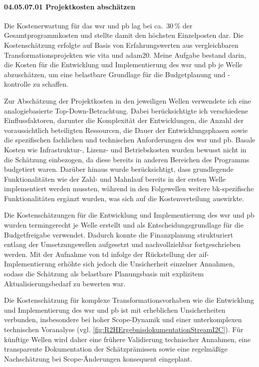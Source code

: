 \paragraph*{04.05.07.01 Projektkosten abschätzen}
\label{para:04.05.07.01_Projektkosten}

\par Die Kostenerwartung für das \gls{wsr} und \gls{pb} lag bei ca.~30\,\% der Gesamtprogrammkosten und stellte damit den höchsten Einzelposten dar. Die Kostenschätzung erfolgte auf Basis von Erfahrungswerten aus vergleichbaren Transformationsprojekten wie \gls{vita} und \gls{adam20}. Meine Aufgabe bestand darin, die Kosten für die Entwicklung und Implementierung des \gls{wsr} und \gls{pb} je Welle abzuschätzen, um eine belastbare Grundlage für die Budgetplanung und -kontrolle zu schaffen.

\par Zur Abschätzung der Projektkosten in den jeweiligen Wellen verwendete ich eine analogiebasierte Top-Down-Betrachtung. Dabei berücksichtigte ich verschiedene Einflussfaktoren, darunter die Komplexität der Entwicklungen, die Anzahl der voraussichtlich beteiligten Ressourcen, die Dauer der Entwicklungsphasen sowie die spezifischen fachlichen und technischen Anforderungen des \gls{wsr} und \gls{pb}. Basale Kosten wie Infrastruktur-, Lizenz- und Betriebskosten wurden bewusst nicht in die Schätzung einbezogen, da diese bereits in anderen Bereichen des Programms budgetiert waren. Darüber hinaus wurde berücksichtigt, dass grundlegende Funktionalitäten wie der Zahl- und Mahnlauf bereits in der ersten Welle implementiert werden mussten, während in den Folgewellen weitere \gls{bk}-spezifische Funktionalitäten ergänzt wurden, was sich auf die Kostenverteilung auswirkte.

\par Die Kostenschätzungen für die Entwicklung und Implementierung des \gls{wsr} und \gls{pb} wurden termingerecht je Welle erstellt und als Entscheidungsgrundlage für die Budgetfreigabe verwendet. Dadurch konnte die Finanzplanung strukturiert entlang der Umsetzungswellen aufgesetzt und nachvollziehbar fortgeschrieben werden. Mit der Aufnahme von \gls{td} infolge der Rückstellung der \gls{aif}-Implementierung erhöhte sich jedoch die Unsicherheit einzelner Annahmen, sodass die Schätzung als belastbare Planungsbasis mit explizitem Aktualisierungsbedarf zu bewerten war.

\par Die Kostenschätzung für komplexe Transformationsvorhaben wie die Entwicklung und Implementierung des \gls{wsr} und \gls{pb} ist mit erheblichen Unsicherheiten verbunden, insbesondere bei hoher Scope-Dynamik und einer unterkomplexen technischen Voranalyse (vgl. \autoref{fig:R2HErgebnisdokumentationStreamI2C}). Für künftige Wellen wird daher eine frühere Validierung technischer Annahmen, eine transparente Dokumentation der Schätzprämissen sowie eine regelmäßige Nachschätzung bei Scope-Änderungen konsequent eingeplant.